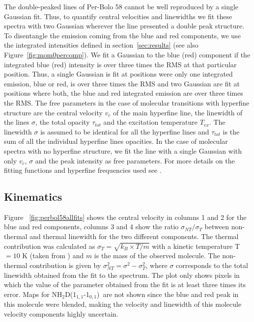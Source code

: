 \documentclass[iop]{emulateapj}
\newcommand{\nhtd}{\mbox{\rm NH$_2$D(1$_{1,1}$-1$_{0,1}$)}}
\begin{document}
The double-peaked lines of Per-Bolo 58 cannot be well reproduced by a single Gaussian fit. Thus, to quantify central velocities and linewidths we fit these spectra with two Gaussian wherever the line presented a double peak structure. To disentangle the emission coming from the blue and red components, we use the integrated intensities defined in section~\ref{sec:results} (see also Figure~\ref{fig:mom0percomp}). We fit a Gaussian to the blue (red) component if the integrated blue (red) intensity is over three times the RMS at that particular position. Thus, a single Gaussian is fit at positions were only
one integrated emission, blue or red, is over three times the RMS and two Gaussian are fit at positions where both, the blue and red integrated emission are over three times the RMS.
The free parameters in the case of molecular transitions with hyperfine structure are the central velocity $v_c$ of the main hyperfine line, the linewidth of the lines $\sigma$, the total opacity $\tau_{tot}$ and the excitation temperature $T_{ex}$. The linewidth $\sigma$ is assumed to be identical for all the hyperfine lines and $\tau_{tot}$ is the sum of all the individual hyperfine lines opacities. In the case of molecular spectra with no hyperfine structure, we fit the line with a single Gaussian with only $v_c$, $\sigma$ and the peak intensity as free parameters. For more details on the fitting functions and hyperfine frequencies used see \cite{2017MaureiraKinematics}.



\subsection{Kinematics}

Figure ~\ref{fig:perbol58allfits} shows the central velocity in columns 1 and 2 for the blue and red components, columns 3 and 4 show the ratio $\sigma_{NT}/\sigma_{T}$ between non-thermal and thermal linewidth for the two different components. The thermal contribution was calculated as $\sigma_{T}=\sqrt{k_{B}\times T/m}$ with a kinetic temperature T$=10$ K (taken from \cite{2008Rosolowsky}) and $m$ is the mass of the observed molecule. The non-thermal contribution is given by $\sigma^2_{NT}=\sigma^2-\sigma^2_{T}$, where $\sigma$ corresponds to the total linewidth obtained from the fit to the spectrum. The plot only shows pixels in which the value of the parameter obtained from the fit is at least three times its error. Maps for \nhtd\ are not shown since the blue and red peak in this molecule were blended, making the velocity and linewidth of this molecule velocity components highly uncertain.
\end{document}
